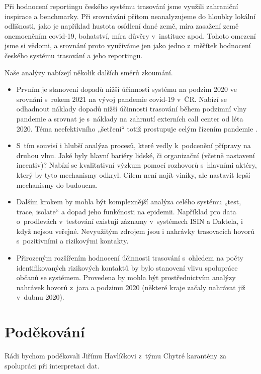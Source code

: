 Při hodnocení reportingu českého systému trasování jsme využili zahraniční inspirace a benchmarky. Při srovnávání přitom neanalyzujeme do hloubky lokální odlišnosti, jako je například hustota osídlení dané země, míra zasažení země onemocněním covid-19, bohatství, míra důvěry v~instituce apod. Tohoto omezení jsme si vědomi, a srovnání proto využíváme jen jako jedno z~měřítek hodnocení českého systému trasování a jeho reportingu.

Naše analýzy nabízejí několik dalších směrů zkoumání.

\begin{itemize}
\item Prvním je stanovení dopadů nižší účinnosti systému na podzim 2020 ve srov\-ná\-ní s~rokem 2021 na vývoj pandemie covid-19 v~ČR. Nabízí se odhadnout náklady dopadů nižší účinnosti trasování během podzimní vlny pandemie a srovnat je s~náklady na zahrnutí externích call center od léta 2020. Téma neefektivního „šetření“ totiž prostupuje celým řízením pandemie \cite{tr_ProkopN, tr_Zidek}.
\item S~tím souvisí i hlubší analýza procesů, které vedly k~podcenění přípravy na druhou vlnu. Jaké byly hlavní bariéry lidské, či organizační (včetně nastavení incentiv)? Nabízí se kvalitativní výzkum pomocí rozhovorů s~hlavními aktéry, který by tyto mechanismy odkryl. Cílem není najít viníky, ale nastavit lepší mechanismy do budoucna.
\item Dalším krokem by mohla být komplexnější analýza celého systému „test, trace, isolate“ a dopad jeho funkčnosti na epidemii. Například pro data o~prodlevách v~testování existují záznamy v~systémech ISIN a Daktela, i když nejsou veřejné. Nevyužitým zdrojem jsou i nahrávky trasovacích hovorů s~pozitivními a rizikovými kontakty.
\item Přirozeným rozšířením hodnocení účinnosti trasování s~ohledem na počty identifikovaných rizikových kontaktů by bylo stanovení vlivu spolupráce občanů se systémem. Provedena by mohla být prostřednictvím analýzy nahrávek hovorů z~jara a podzimu 2020 (některé kraje začaly nahrávat již v~dubnu 2020).
\end{itemize}

\section*{Poděkování}

Rádi bychom poděkovali Jiřímu Havlíčkovi z~týmu Chytré karantény za spolupráci při interpretaci dat.
